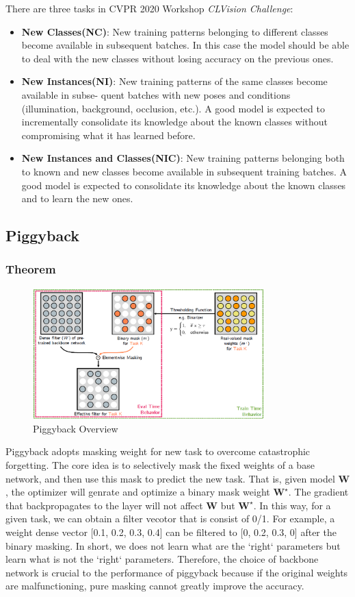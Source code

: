 There are three tasks in CVPR 2020 Workshop \textit{CLVision Challenge}:
\begin{itemize}
\item \textbf{New Classes(NC)}: New training patterns belonging to different classes become available in subsequent batches. In this case the model should be able to deal with the new classes without losing accuracy on the previous ones.
\item \textbf{New Instances(NI)}: New training patterns of the same classes become available in subse- quent batches with new poses and conditions (illumination, background, occlusion, etc.). A good model is expected to incrementally consolidate its knowledge about the known classes without compromising what it has learned before.
\item \textbf{New Instances and Classes(NIC)}: New training patterns belonging both to known and new classes become available in subsequent training batches. A good model is expected to consolidate its knowledge about the known classes and to learn the new ones.
\end{itemize} 


\subsection{Piggyback}
\subsubsection{Theorem}
\begin{figure}[hbp]
  \centering
  \includegraphics[width=0.8\textwidth]{figure/piggyback.png}
  \caption{Piggyback Overview}
  \label{piggy}
\end{figure}

Piggyback adopts masking weight for new task to overcome catastrophic forgetting. The core idea is to selectively mask the fixed weights of a base network, and then use this mask to predict the new task. That is, given model $\mathbf{W}$, the optimizer will genrate and optimize a binary mask weight $\mathbf{W}^\star$. The gradient that backpropagates to the layer will not affect $\mathbf{W}$ but $\mathbf{W}^{\star}$. In this way, for a given task, we can obtain a filter vecotor that is consist of 0/1. For example, a weight dense vector [0.1, 0.2, 0.3, 0.4] can be filtered to [0, 0.2, 0.3, 0] after the binary masking. In short, we does not learn what are the `right` parameters but learn what is not the `right` parameters. Therefore, the choice of backbone network is crucial to the performance of piggyback because if the original weights are malfunctioning, pure masking cannot greatly improve the accuracy.

